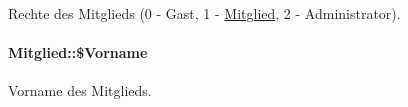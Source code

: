 Rechte des Mitglieds (0 - Gast, 1 - \hyperlink{classMitglied}{Mitglied}, 2 - Administrator). 

\hypertarget{classMitglied_157424daca1ecda5b6f6a3e0f24ecfce}{
\paragraph[\$Vorname]{\setlength{\rightskip}{0pt plus 5cm}Mitglied::\$Vorname}\hfill}
\label{classMitglied_157424daca1ecda5b6f6a3e0f24ecfce}


Vorname des Mitglieds. 

